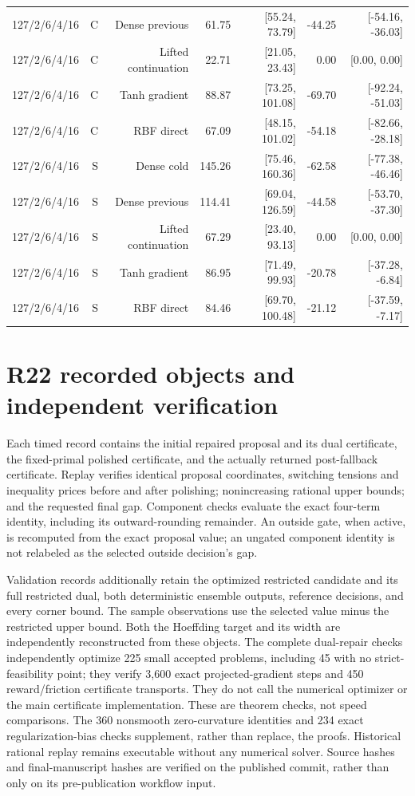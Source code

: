 \documentclass[11pt,letterpaper]{article}
\theoremstyle{definition}
\newcommand{\1}{\mathbf 1}
\begin{document}
\begin{table}[tbp]
\begin{tabular}{lrrrrrr}
127/2/6/4/16 & C & Dense previous & 61.75 & [55.24, 73.79] & -44.25 & [-54.16, -36.03]\\
127/2/6/4/16 & C & Lifted continuation & 22.71 & [21.05, 23.43] & 0.00 & [0.00, 0.00]\\
127/2/6/4/16 & C & Tanh gradient & 88.87 & [73.25, 101.08] & -69.70 & [-92.24, -51.03]\\
127/2/6/4/16 & C & RBF direct & 67.09 & [48.15, 101.02] & -54.18 & [-82.66, -28.18]\\
127/2/6/4/16 & S & Dense cold & 145.26 & [75.46, 160.36] & -62.58 & [-77.38, -46.46]\\
127/2/6/4/16 & S & Dense previous & 114.41 & [69.04, 126.59] & -44.58 & [-53.70, -37.30]\\
127/2/6/4/16 & S & Lifted continuation & 67.29 & [23.40, 93.13] & 0.00 & [0.00, 0.00]\\
127/2/6/4/16 & S & Tanh gradient & 86.95 & [71.49, 99.93] & -20.78 & [-37.28, -6.84]\\
127/2/6/4/16 & S & RBF direct & 84.46 & [69.70, 100.48] & -21.12 & [-37.59, -7.17]\\
\bottomrule
\end{tabular}
\end{table}


\section{R22 recorded objects and independent verification}
Each timed record contains the initial repaired proposal and its dual certificate, the fixed-primal polished certificate, and the actually returned post-fallback certificate. Replay verifies identical proposal coordinates, switching tensions and inequality prices before and after polishing; nonincreasing rational upper bounds; and the requested final gap. Component checks evaluate the exact four-term identity, including its outward-rounding remainder. An outside gate, when active, is recomputed from the exact proposal value; an ungated component identity is not relabeled as the selected outside decision's gap.

Validation records additionally retain the optimized restricted candidate and its full restricted dual, both deterministic ensemble outputs, reference decisions, and every corner bound. The sample observations use the selected value minus the restricted upper bound. Both the Hoeffding target and its width are independently reconstructed from these objects. The complete dual-repair checks independently optimize 225 small accepted problems, including 45 with no strict-feasibility point; they verify 3,600 exact projected-gradient steps and 450 reward/friction certificate transports. They do not call the numerical optimizer or the main certificate implementation. These are theorem checks, not speed comparisons. The 360 nonsmooth zero-curvature identities and 234 exact regularization-bias checks supplement, rather than replace, the proofs. Historical rational replay remains executable without any numerical solver. Source hashes and final-manuscript hashes are verified on the published commit, rather than only on its pre-publication workflow input.
\end{document}
